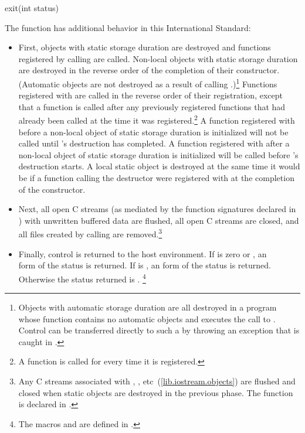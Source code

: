 %
\begin{itemdecl}
exit(int status)
\end{itemdecl}

\begin{itemdescr}
\pnum
The function
has additional behavior in this International Standard:

\begin{itemize}
\item
First, objects with static storage duration are destroyed
and functions registered by calling
are called.
Non-local objects with static storage duration are destroyed in the
reverse order of the completion of their constructor.
(Automatic objects are not destroyed as a result of calling
.)\footnote{Objects with automatic storage duration are all destroyed in a program whose
function
contains no automatic objects and executes the call to
.
Control can be transferred directly to such a
by throwing an exception that is caught in
.}
Functions registered with  are called in the reverse order of
their registration, except that a function is called after any previously
registered functions that had already been called at the time it was
registered.\footnote{A function is called for every time it is registered.}
A function registered with  before a non-local object 
of static storage duration is initialized will not be called until
's destruction has completed. A function registered with
 after a non-local object  of static storage
duration is initialized will be called before 's destruction
starts. A local static object  is destroyed at the same time it
would be if a function calling the  destructor were registered
with  at the completion of the  constructor.

\item
Next, all open C streams (as mediated by the function
signatures declared in
)
with unwritten buffered data are flushed, all open C
streams are closed, and all files created by calling
are removed.\footnote{Any C streams associated with , ,
etc~(\ref{lib.iostream.objects}) are flushed and closed when static objects are destroyed in the
previous phase. The function  is declared in
.}

\item
Finally, control is returned to the host environment.
If  is zero or
,
an \\
form of the status
is returned.
%
If  is
,
an  form of the status
is returned.
%
Otherwise the status returned is .%
\footnote{The macros
and
are defined in
.}
\end{itemize}


\end{itemdescr}
